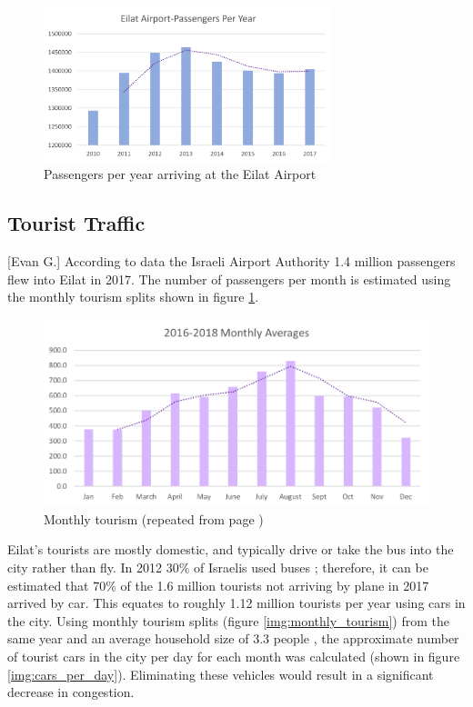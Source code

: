 \documentclass[12pt]{article}                               %
\newcommand{\repeatcaption}[2]{                             %
  \renewcommand{\thefigure}{\ref{#1}}
  \captionsetup{list=no}
  \caption{#2 (repeated from page \pageref{#1})}
}
\begin{document}
\begin{figure}[H]
    \centering
    \includegraphics[width=0.75\textwidth]{images/passengers_per_year.png}
    \caption{Passengers per year arriving at the Eilat Airport}
    \label{img:passengers_per_year}
\end{figure}

\subsection{Tourist Traffic}[Evan G.]
According to data the Israeli Airport Authority 1.4 million passengers flew into Eilat in 2017. The number of passengers per month is estimated using the monthly tourism splits shown in figure \ref{img:passengers_per_year}.

\begin{figure}[H]
    \centering
    \includegraphics[width=.75\textwidth]{images/monthy_tourism_averages.png}
    \repeatcaption{img:monthly_tourism}{Monthly tourism}
\end{figure}

Eilat's tourists are mostly domestic, and typically drive or take the bus into the city rather than fly. In 2012 30\% of Israelis used buses \cite{Port2Port2012NewTransit,Petersburg2012LessTransit}; therefore, it can be estimated that 70\% of the 1.6 million tourists not arriving by plane in 2017 arrived by car. This equates to roughly 1.12 million tourists per year using cars in the city. Using monthly tourism splits (figure \ref{img:monthly_tourism}) from the same year and an average household size of 3.3 people \cite{CentralBuereauofStatistics2018IsraelNumbers}, the approximate number of tourist cars in the city per day for each month was calculated (shown in figure \ref{img:cars_per_day}). Eliminating these vehicles would result in a significant decrease in congestion.
\end{document}
